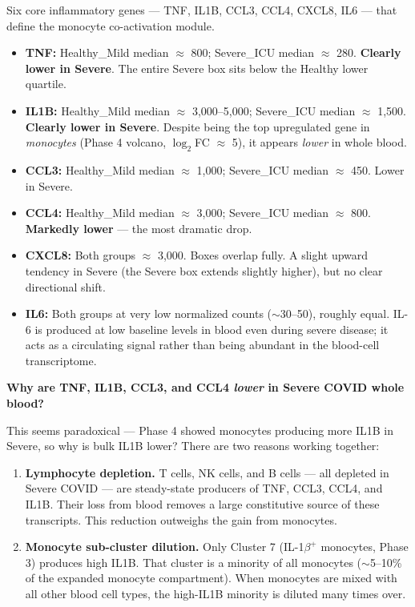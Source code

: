 \documentclass[11pt, a4paper]{article}
\begin{document}
Six core inflammatory genes — TNF, IL1B, CCL3, CCL4, CXCL8, IL6 — that define
the monocyte co-activation module.

\begin{itemize}[nosep]
  \item \textbf{TNF:} Healthy\_Mild median $\approx$ 800; Severe\_ICU median
        $\approx$ 280. \textbf{Clearly lower in Severe}. The entire Severe
        box sits below the Healthy lower quartile.
  \item \textbf{IL1B:} Healthy\_Mild median $\approx$ 3,000--5,000;
        Severe\_ICU median $\approx$ 1,500. \textbf{Clearly lower in Severe}.
        Despite being the top upregulated gene in \textit{monocytes} (Phase 4
        volcano, $\log_2$FC $\approx$ 5), it appears \textit{lower} in whole blood.
  \item \textbf{CCL3:} Healthy\_Mild median $\approx$ 1,000; Severe\_ICU median
        $\approx$ 450. Lower in Severe.
  \item \textbf{CCL4:} Healthy\_Mild median $\approx$ 3,000; Severe\_ICU median
        $\approx$ 800. \textbf{Markedly lower} — the most dramatic drop.
  \item \textbf{CXCL8:} Both groups $\approx$ 3,000. Boxes overlap fully.
        A slight upward tendency in Severe (the Severe box extends slightly
        higher), but no clear directional shift.
  \item \textbf{IL6:} Both groups at very low normalized counts ($\sim$30--50),
        roughly equal. IL-6 is produced at low baseline levels in blood even
        during severe disease; it acts as a circulating signal rather than being
        abundant in the blood-cell transcriptome.
\end{itemize}

\textbf{Why are TNF, IL1B, CCL3, and CCL4 \textit{lower} in Severe COVID whole blood?}

This seems paradoxical — Phase 4 showed monocytes producing more IL1B in Severe,
so why is bulk IL1B lower? There are two reasons working together:

\begin{enumerate}[nosep]
  \item \textbf{Lymphocyte depletion.}
        T cells, NK cells, and B cells — all depleted in Severe COVID —
        are steady-state producers of TNF, CCL3, CCL4, and IL1B.
        Their loss from blood removes a large constitutive source of these
        transcripts. This reduction outweighs the gain from monocytes.

  \item \textbf{Monocyte sub-cluster dilution.}
        Only Cluster 7 (IL-1$\beta^+$ monocytes, Phase 3) produces high IL1B.
        That cluster is a minority of all monocytes ($\sim$5--10\% of the
        expanded monocyte compartment). When monocytes are mixed with all other
        blood cell types, the high-IL1B minority is diluted many times over.
\end{enumerate}
\end{document}
